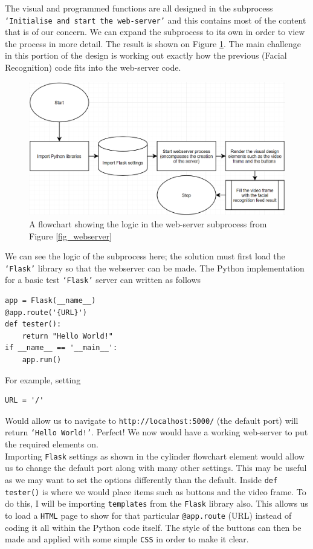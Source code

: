 \documentclass[9pt]{article}
\begin{document}
The visual and programmed functions are all designed in the subprocess \texttt{`Initialise and start the web-server'} and this contains most of the content that is of our concern. We can expand the subprocess to its own in order to view the process in more detail. The result is shown on Figure \ref{fig_webserverExpand1}. The main challenge in this portion of the design is working out exactly how the previous (Facial Recognition) code fits into the web-server code.
\begin{figure}[H]
	\centering
	\includegraphics[width=5in]{webserverExtended.png}
	\caption{A flowchart showing the logic in the web-server subprocess from Figure \ref{fig_webserver}}\label{fig_webserverExpand1}
\end{figure}
We can see the logic of the subprocess here; the solution must first load the \texttt{`Flask'} library so that the webserver can be made. The Python implementation for a basic test \texttt{`Flask'} server can written as follows
\begin{lstlisting}
app = Flask(__name__)
@app.route('{URL}')
def tester():
	return "Hello World!"
if __name__ == '__main__':
	app.run()
\end{lstlisting}
For example, setting
\begin{lstlisting}
URL = '/'
\end{lstlisting}
Would allow us to navigate to \texttt{http://localhost:5000/} (the default port) will return \texttt{`Hello World!'}. Perfect! We now would have a working web-server to put the required elements on.\\
Importing \texttt{Flask} settings as shown in the cylinder flowchart element would allow us to change the default port along with many other settings. This may be useful as we may want to set the options differently than the default. Inside \texttt{def tester()} is where we would place items such as buttons and the video frame. To do this, I will be importing \texttt{templates} from the \texttt{Flask} library also. This allows us to load a \texttt{HTML} page to show for that particular \texttt{@app.route} (URL) instead of coding it all within the Python code itself. The style of the buttons can then be made and applied with some simple \texttt{CSS} in order to make it clear. \\
\end{document}
